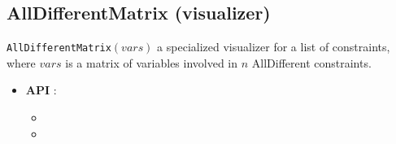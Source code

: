 \subsection{AllDifferentMatrix (visualizer)}\label{alldiffmatrix:visu}\hypertarget{alldiffmatrix:visu}{}
\begin{notedef}
  \texttt{AllDifferentMatrix}$(vars)$ a specialized visualizer for a list of  constraints, where $vars$ is a matrix of variables involved in $n$ AllDifferent constraints.
\end{notedef}

\begin{itemize}
	\item \textbf{API} : 
	\begin{itemize}
	\item {}
	\item {}
	\end{itemize}
\end{itemize}

%

